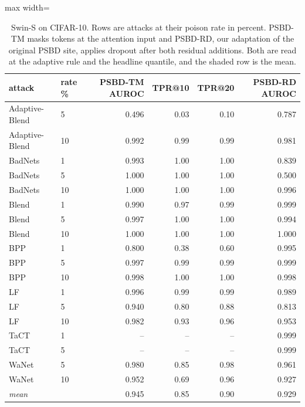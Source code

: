 \begin{table}[htbp]
\centering
\small
\caption{Swin-S on CIFAR-10. Rows are attacks at their poison rate in percent. PSBD-TM masks tokens at the attention input and PSBD-RD, our adaptation of the original PSBD site, applies dropout after both residual additions. Both are read at the adaptive rule and the headline quantile, and the shaded row is the mean.}
\label{tab:swin-attacks}
\begin{adjustbox}{max width=\linewidth}
\begin{tabular}{llrrrr}
\toprule
attack & rate \% & PSBD-TM AUROC & TPR@10 & TPR@20 & PSBD-RD AUROC \\
\midrule
Adaptive-Blend & 5 & 0.496 & 0.03 & 0.10 & 0.787 \\
Adaptive-Blend & 10 & 0.992 & 0.99 & 0.99 & 0.981 \\
BadNets & 1 & 0.993 & 1.00 & 1.00 & 0.839 \\
BadNets & 5 & 1.000 & 1.00 & 1.00 & 0.500 \\
BadNets & 10 & 1.000 & 1.00 & 1.00 & 0.996 \\
Blend & 1 & 0.990 & 0.97 & 0.99 & 0.999 \\
Blend & 5 & 0.997 & 1.00 & 1.00 & 0.994 \\
Blend & 10 & 1.000 & 1.00 & 1.00 & 1.000 \\
BPP & 1 & 0.800 & 0.38 & 0.60 & 0.995 \\
BPP & 5 & 0.997 & 0.99 & 0.99 & 0.999 \\
BPP & 10 & 0.998 & 1.00 & 1.00 & 0.998 \\
LF & 1 & 0.996 & 0.99 & 0.99 & 0.989 \\
LF & 5 & 0.940 & 0.80 & 0.88 & 0.813 \\
LF & 10 & 0.982 & 0.93 & 0.96 & 0.953 \\
TaCT & 1 & -- & -- & -- & 0.999 \\
TaCT & 5 & -- & -- & -- & 0.999 \\
WaNet & 5 & 0.980 & 0.85 & 0.98 & 0.961 \\
WaNet & 10 & 0.952 & 0.69 & 0.96 & 0.927 \\
\rowcolor{black!8}\emph{mean} &  & 0.945 & 0.85 & 0.90 & 0.929 \\
\bottomrule
\end{tabular}
\end{adjustbox}
\end{table}
